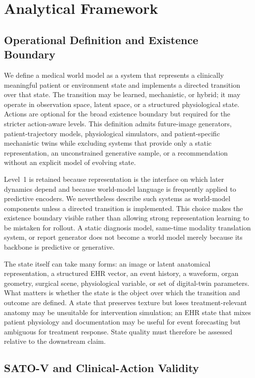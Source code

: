 \section{Analytical Framework}
\label{sec:framework}

\subsection{Operational Definition and Existence Boundary}

We define a medical world model as a system that represents a clinically meaningful patient or environment state and implements a directed transition over that state. The transition may be learned, mechanistic, or hybrid; it may operate in observation space, latent space, or a structured physiological state. Actions are optional for the broad existence boundary but required for the stricter action-aware levels. This definition admits future-image generators, patient-trajectory models, physiological simulators, and patient-specific mechanistic twins while excluding systems that provide only a static representation, an unconstrained generative sample, or a recommendation without an explicit model of evolving state.

Level~1 is retained because representation is the interface on which later dynamics depend and because world-model language is frequently applied to predictive encoders. We nevertheless describe such systems as world-model components unless a directed transition is implemented. This choice makes the existence boundary visible rather than allowing strong representation learning to be mistaken for rollout. A static diagnosis model, same-time modality translation system, or report generator does not become a world model merely because its backbone is predictive or generative.

The state itself can take many forms: an image or latent anatomical representation, a structured EHR vector, an event history, a waveform, organ geometry, surgical scene, physiological variable, or set of digital-twin parameters. What matters is whether the state is the object over which the transition and outcome are defined. A state that preserves texture but loses treatment-relevant anatomy may be unsuitable for intervention simulation; an EHR state that mixes patient physiology and documentation may be useful for event forecasting but ambiguous for treatment response. State quality must therefore be assessed relative to the downstream claim.

\subsection{SATO-V and Clinical-Action Validity}

